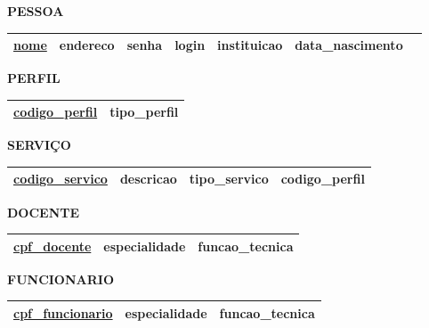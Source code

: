 \documentclass{article}
\begin{document}
\noindent
\textbf{PESSOA}
\vspace{-5pt}

\begin{table}[H]
  \renewcommand{\arraystretch}{1.5}
  \begin{tabular}{|c|c|c|c|c|c|c|}
    \hline
    \underline{nome} &
    endereco &
    senha &
    login &
    instituicao &
    data\_nascimento \\
    \hline
  \end{tabular}
\end{table}

\noindent
\textbf{PERFIL}
\vspace{-5pt}

\begin{table}[H]
  \renewcommand{\arraystretch}{1.5}
  \begin{tabular}{|c|c|}
    \hline
    \underline{codigo\_perfil} &
    tipo\_perfil \\
    \hline
  \end{tabular}
\end{table}

\noindent
\textbf{SERVIÇO}
\vspace{-5pt}

\begin{table}[H]
  \renewcommand{\arraystretch}{1.5}
  \begin{tabular}{|c|c|c|c|}
    \hline
    \underline{codigo\_servico} &
    descricao &
    tipo\_servico &
    codigo\_perfil \\
    \hline
  \end{tabular}
\end{table}

\noindent
\textbf{DOCENTE}
\vspace{-5pt}

\begin{table}[H]
  \renewcommand{\arraystretch}{1.5}
  \begin{tabular}{|c|c|c|}
    \hline
    \underline{cpf\_docente} &
    especialidade &
    funcao\_tecnica \\
    \hline
  \end{tabular}
\end{table}

\noindent
\textbf{FUNCIONARIO}
\vspace{-5pt}

\begin{table}[H]
  \renewcommand{\arraystretch}{1.5}
  \begin{tabular}{|c|c|c|}
    \hline
    \underline{cpf\_funcionario} &
    especialidade &
    funcao\_tecnica \\
    \hline
  \end{tabular}
\end{table}
\end{document}
